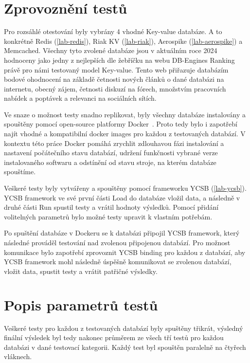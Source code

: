\documentclass[czech,master,dept460,male,csharp,cpdeclaration]{diploma}
\begin{document}
	\section{Zprovoznění testů}
	
	Pro rozsáhlé otestování byly vybrány 4 vhodné Key-value databáze. A to konkrétně Redis (\ref{lab-redis}), Riak KV (\ref{lab-riak}), Aerospike (\ref{lab-aerospike}) a Memcached. Všechny tyto zvolené databáze jsou v aktuálním roce 2024 hodnoceny jako jedny z nejlepších dle žebříčku na webu DB-Engines Ranking~\cite{db-engineers-ranking} právě pro námi testovaný model Key-value. Tento web přiřazuje databázím bodové ohodnocení na základě četnosti nových článků o dané databázi na internetu, obecný zájem, četnosti diskuzí na fórech, množstvím pracovních nabídek a poptávek a relevanci na sociálních sítích.
	
	Ve snaze o možnost testy snadno replikovat, byly všechny databáze instalovány a spouštěny pomocí open-source platformy Docker~\cite{docker}. Proto tedy bylo i zapotřebí najít vhodné a kompatibilní docker images pro každou z testovaných databází. V kontextu této práce Docker pomáhá zrychlit zdlouhavou fázi instalování a nastavení počátečního stavu databází, udržení funkčnosti vybrané verze instalovaného softwaru a odstínění od stavu stroje, na kterém databáze spouštíme.
	
	Veškeré testy byly vytvářeny a spouštěny pomocí frameworku YCSB (\ref{lab-ycsb}). YCSB framework ve své první části Load do databáze vložil data, a následně v druhé části Run spustil testy a vrátil hodnoty výsledků. Pomocí přidání volitelných parametrů bylo možné testy upravit k vlastním potřebám.
	
	Po spuštění databáze v Dockeru se k databázi připojil YCSB framework, který následné prováděl testování nad zvolenou připojenou databází. Pro možnost komunikace bylo zapotřebí zprovoznit YCSB binding pro každou z databází, aby YCSB framework mohl následně úspěšně komunikovat se zvolenou databází, vložit data, spustit testy a vrátit patřičné výsledky.
	
	\section{Popis parametrů testů}
	
	Veškeré testy pro každou z testovaných databází byly spuštěny třikrát, výsledný finální výsledek byl tedy nakonec průměrem ze všech tří testů pro každou databázi v dané testovací kategorii. Každý test byl spouštěn paralelně na čtyřech vláknech.
	
\end{document}
